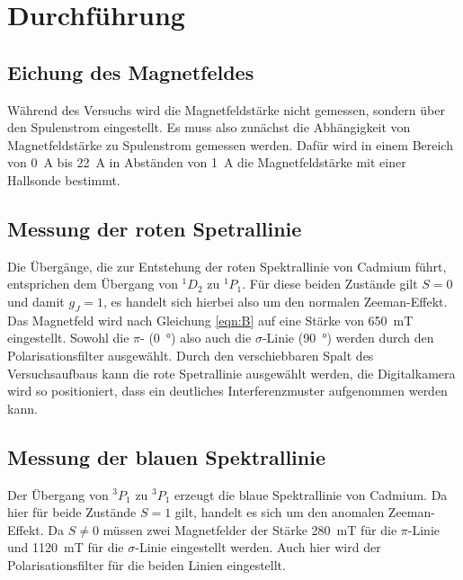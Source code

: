 \section{Durchführung}
\subsection{Eichung des Magnetfeldes}
Während des Versuchs wird die Magnetfeldstärke nicht gemessen, sondern über den Spulenstrom eingestellt.
Es muss also zunächst die Abhängigkeit von Magnetfeldstärke zu Spulenstrom gemessen werden.
Dafür wird in einem Bereich von \SI{0}{\ampere} bis \SI{22}{\ampere} in Abständen von \SI{1}{\ampere} die Magnetfeldstärke mit einer Hallsonde bestimmt.

\subsection{Messung der roten Spetrallinie}

Die Übergänge, die zur Entstehung der roten Spektrallinie von Cadmium führt, entsprichen dem Übergang von $^1D_2$ zu $^1P_1$.
Für diese beiden Zustände gilt $S=0$ und damit $g_J = 1$, es handelt sich hierbei also um den normalen Zeeman-Effekt.
Das Magnetfeld wird nach Gleichung \eqref{eqn:B} auf eine Stärke von \SI{650}{\milli\tesla} eingestellt.
Sowohl die $\pi$- (\SI{0}{\degree}) also auch die $\sigma$-Linie (\SI{90}{\degree}) werden durch den Polarisationsfilter ausgewählt.
Durch den verschiebbaren Spalt des Versuchsaufbaus kann die rote Spetrallinie ausgewählt werden, die Digitalkamera wird so positioniert, dass ein deutliches Interferenzmuster aufgenommen werden kann.


\subsection{Messung der blauen Spektrallinie}
Der Übergang von $^3P_1$ zu $^3P_1$ erzeugt die blaue Spektrallinie von Cadmium.
Da hier für beide Zustände $S=1$ gilt, handelt es sich um den anomalen Zeeman-Effekt.
Da $S \neq 0$ müssen zwei Magnetfelder der Stärke \SI{280}{\milli\tesla} für die $\pi$-Linie und \SI{1120}{\milli\tesla} für die $\sigma$-Linie eingestellt werden.
Auch hier wird der Polarisationsfilter für die beiden Linien eingestellt.







